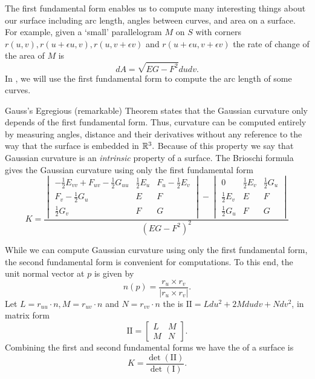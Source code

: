 The first fundamental form enables us to  compute many interesting
things about our surface including arc length, angles between curves,
and area on a surface.
For example,
given a `small' parallelogram $M$ on $S$ with corners $r(u,v),r(u+\epsilon u, v), r(u,v+\epsilon v)$ 
and $r(u+\epsilon u, v+\epsilon v)$ the rate of change of the area of $M$ is 
$$dA=\sqrt{EG-F^2}dudv.$$
In , we will use the first fundamental form to compute the arc length of some curves.


Gauss's Egregious (remarkable) Theorem states that the Gaussian curvature only depends
of the first fundamental form. Thus, curvature can be computed entirely by measuring angles, distance 
and their derivatives without any reference to the way that the surface is embedded in $\mathbb{R}^3.$
Because of this property we say that Gaussian curvature is an \emph{intrinsic} property of a surface.
The Brioschi formula gives the Gaussian curvature using only the first fundamental form
\begin{equation}\label{eq:brioschi}
	K=\frac{\begin{vmatrix}
-\frac{1}{2}E_{vv}+F_{uv}-\frac{1}{2}G_{uu} & \frac{1}{2}E_u & F_u-\frac{1}{2}E_v\\
F_v-\frac{1}{2}G_u & E & F\\
\frac{1}{2}G_v & F & G
\end{vmatrix}-\begin{vmatrix}
0 & \frac{1}{2}E_v & \frac{1}{2}G_u\\
\frac{1}{2}E_v & E & F\\
\frac{1}{2}G_u & F & G
\end{vmatrix}}{(EG-F^2)^2}
\end{equation}



While we can compute Gaussian curvature using only the first fundamental form,
 the second fundamental form is convenient for computations.
To this end, the unit normal vector at $p$ is given by $$n(p)=\frac{r_u\times r_v}{|r_u\times r_v|}.$$
Let $L=r_{uu}\cdot n, M=r_{uv}\cdot n$ and $N=r_{vv}\cdot n$ the
 is $\mathrm{I\!I}=Ldu^2+2Mdudv+Ndv^2$,
in matrix form $$\mathrm{I\!I}=\begin{bmatrix}
L & M \\
M & N 
\end{bmatrix}.$$
Combining the first and second fundamental forms we have
the  of a surface is
\begin{equation}\label{eqn:curve-dets}
 	K=\frac{\det(\mathrm{I\!I})}{\det(\mathrm{I})}.
\end{equation}

